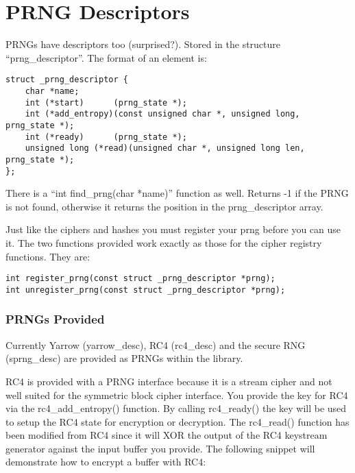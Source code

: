 \documentclass{book}
\begin{document}
\section{PRNG Descriptors}
PRNGs have descriptors too (surprised?). Stored in the structure ``prng\_descriptor''.  The format of an element is:
\begin{verbatim}
struct _prng_descriptor {
    char *name;
    int (*start)      (prng_state *);
    int (*add_entropy)(const unsigned char *, unsigned long, prng_state *);
    int (*ready)      (prng_state *);
    unsigned long (*read)(unsigned char *, unsigned long len, prng_state *);
};
\end{verbatim}

There is a ``int find\_prng(char *name)'' function as well.  Returns -1 if the PRNG is not found, otherwise it returns
the position in the prng\_descriptor array.

Just like the ciphers and hashes you must register your prng before you can use it.  The two functions provided work
exactly as those for the cipher registry functions.  They are:
\begin{verbatim}
int register_prng(const struct _prng_descriptor *prng);
int unregister_prng(const struct _prng_descriptor *prng);
\end{verbatim}

\subsubsection{PRNGs Provided}
Currently Yarrow (yarrow\_desc), RC4 (rc4\_desc) and the secure RNG (sprng\_desc) are provided as PRNGs within the 
library.  

RC4 is provided with a PRNG interface because it is a stream cipher and not well suited for the symmetric block cipher
interface.  You provide the key for RC4 via the rc4\_add\_entropy() function.  By calling rc4\_ready() the key will be used
to setup the RC4 state for encryption or decryption.  The rc4\_read() function has been modified from RC4 since it will 
XOR the output of the RC4 keystream generator against the input buffer you provide.  The following snippet will demonstrate
how to encrypt a buffer with RC4:
\end{document}
